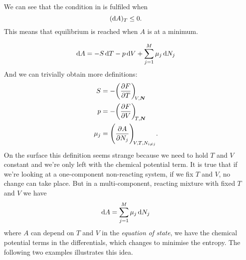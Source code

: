 \begin{prt}
We can see that the condition in  is fulfiled when 
\begin{equation}
(\dif A)_T\leq0. 
\end{equation}
This means that equilibrium is reached when $A$ is at a minimum.
\end{prt}
\begin{prt}
\begin{equation}
\dif A=-S\dif T-p\dif V+\sum_{j=1}^M\mu_j\dif N_j
\end{equation}
And we can trivially obtain more definitions:
\begin{subequations}
\begin{align}
S&=-\diffp FT[V,\bvec{N}]\\
p&=-\diffp FV[T,\bvec{N}]\\
\mu_j&=\diffp{A}{N_j}[V,T,N_{i\neq j}]. 
\end{align}
\end{subequations}
On the surface this definition seems strange because we need to hold $T$ and $V$ constant and we're only left with the chemical potential term. It is true that if we're looking at a one-component non-reacting system, if we fix $T$ and $V$, no change can take place. But in a multi-component, reacting mixture with fixed $T$ and $V$ we have 
\begin{equation}
\dif A=\sum_{j=1}^M\mu_j\dif N_j
\end{equation}where $A$ can depend on $T$ and $V$ in the \textit{equation of state}, we have the chemical potential terms in the differentials, which changes to minimise the entropy. The following two examples illustrates this idea.
\end{prt}
